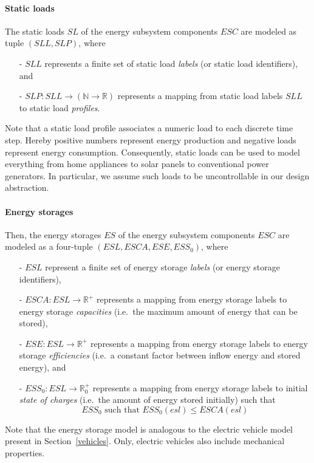 \paragraph{Static loads}
\label{static_loads}

The static loads $SL$ of the energy subsystem components $ESC$ are modeled as tuple $(SLL, SLP)$, where
\begin{itemize}
	\item[-] $SLL$ represents a finite set of static load \textit{labels} (or static load identifiers), and
	\item[-] $SLP: SLL \rightarrow (\mathbb{N} \rightarrow \mathbb{R})$ represents a mapping from static load labels $SLL$ to static load \textit{profiles}.
\end{itemize}
Note that a static load profile associates a numeric load to each discrete time step. Hereby positive numbers represent energy production and negative loads represent energy consumption. Consequently, static loads can be used to model everything from home appliances to solar panels to conventional power generators. In particular, we assume such loads to be uncontrollable in our design abstraction.


\paragraph{Energy storages}
\label{energy_storages}

Then, the energy storages $ES$ of the energy subsystem components $ESC$ are modeled as a four-tuple $(ESL, ESCA, ESE, ESS_0)$, where
\begin{itemize}
	\item[-] $ESL$ represent a finite set of energy storage \textit{labels} (or energy storage identifiers),
	\item[-] $ESCA: ESL \rightarrow \mathbb{R}^+$ represents a mapping from energy storage labels to energy storage \textit{capacities} (i.e.\ the maximum amount of energy that can be stored),
	\item[-] $ESE: ESL \rightarrow \mathbb{R}^+$ represents a mapping from energy storage labels to energy storage \textit{efficiencies} (i.e.\ a constant factor between inflow energy and stored energy), and
	\item[-] $ESS_0: ESL \rightarrow \mathbb{R}_0^+$ represents a mapping from energy storage labels to initial \textit{state of charges} (i.e.\ the amount of energy stored initially) such that
	\[
		ESS_0 \textrm{ such that } ESS_0(esl) \leq ESCA(esl)
	\]
\end{itemize}
Note that the energy storage model is analogous to the electric vehicle model present in Section~\ref{vehicles}. Only, electric vehicles also include mechanical properties.

